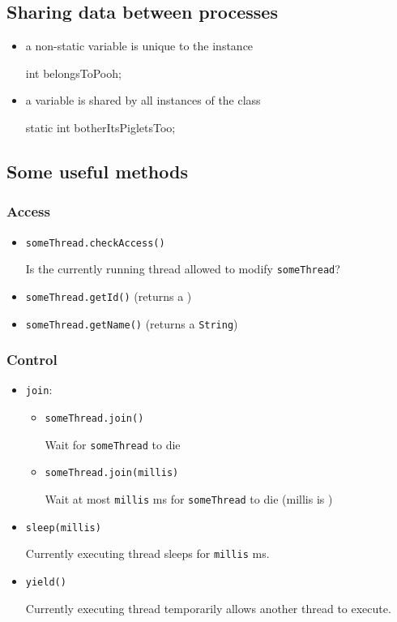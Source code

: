 \documentclass{article}
\begin{document}
\subsection{Sharing data between processes}
\begin{itemize}
\item a non-static variable is unique to the instance
\begin{flushleft}
int belongsToPooh;
\EndSystem
\end{flushleft}
\item a  variable is shared by all instances of the class
\begin{flushleft}
static int botherItsPigletsToo;
\EndSystem
\end{flushleft}
\end{itemize}

\subsection{Some useful methods}
\subsubsection{Access}
\begin{itemize}
\item {\tt someThread.checkAccess()}

Is the currently running thread allowed to modify {\tt someThread}?
\item {\tt someThread.getId()} (returns a )
\item {\tt someThread.getName()} (returns a {\tt String})
\end{itemize}

\subsubsection{Control}
\begin{itemize}
\item {\tt join}:
\begin{itemize}
\item {\tt someThread.join()}

Wait for {\tt someThread} to die
\item {\tt someThread.join(millis)}

Wait at most {\tt millis} ms for {\tt someThread} to die (millis is )
\end{itemize}
\item {}  {\tt sleep(millis)}

Currently executing thread sleeps for {\tt millis} ms.
\item {}  {\tt yield()}

Currently executing thread temporarily allows another thread to execute.
\end{itemize}
\end{document}
